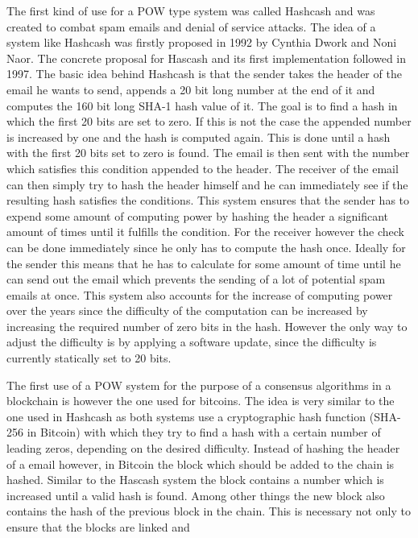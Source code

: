 The first kind of use for a POW type system was called Hashcash\cite{url:hashcash} and was created to combat spam emails and denial of service attacks. The idea of a system like Hashcash was firstly
proposed in 1992 by Cynthia Dwork and Noni Naor.\cite{url:pow_email} The concrete proposal for Hascash and its first implementation followed in 1997.\cite{url:hashcash} The basic idea behind Hashcash
is that the sender takes the header of the email he wants to send, appends a 20 bit long number at the end of it and computes the 160 bit long SHA-1 hash value of it. The goal is to find a hash in
which the first 20 bits are set to zero. If this is not the case the appended number is increased by one and the hash is computed again. This is done until a hash with the first 20 bits set to zero is
found. The email is then sent with the number which satisfies this condition appended to the header. The receiver of the email can then simply try to hash the header himself and he can immediately see
if the resulting hash satisfies the conditions. This system ensures that the sender has to expend some amount of computing power by hashing the header a significant amount of times until it fulfills
the condition. For the receiver however the check can be done immediately since he only has to compute the hash once. Ideally for the sender this means that he has to calculate for some amount of time
until he can send out the email which prevents the sending of a lot of potential spam emails at once. This system also accounts for the increase of computing power over the years since the difficulty
of the computation can be increased by increasing the required number of zero bits in the hash. However the only way to adjust the difficulty is by applying a software update, since the difficulty is
currently statically set to 20 bits.\par The first use of a POW system for the purpose of a consensus algorithms in a blockchain is however the one used for bitcoins. The idea is very similar to the
one used in Hashcash as both systems use a cryptographic hash function (SHA-256 in Bitcoin) with which they try to find a hash with a certain number of leading zeros, depending on the desired
difficulty. Instead of hashing the header of a email however, in Bitcoin the block which should be added to the chain is hashed. Similar to the Hascash system the block contains a number which is
increased until a valid hash is found. Among other things the new block also contains the hash of the previous block in the chain. This is necessary not only to ensure that the blocks are linked and
